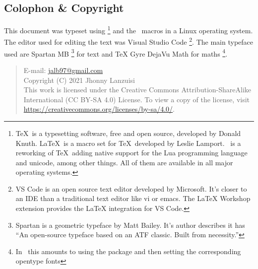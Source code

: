 \newpage
\begin{small}
    \begin{center}
    \begin{minipage}{0.4\paperwidth}
        \section*{Colophon \& Copyright}
        This document was typeset using \LuaTeX%
        \footnote{%
            \TeX\ is
            a typesetting software, free and open source,
            developed by Donald Knuth. \LaTeX\ is a macro
            set for \TeX\ developed by Leslie Lamport. \LuaTeX\ is
            a reworking of \TeX\ adding native support for the Lua
            programming language and unicode, among other things.
            All of them are available in all major
            operating systems.
        }
        and the \LaTeXe\ macros in a Linux operating system.
        The editor used for editing the text was Visual Studio Code%
        \footnote{%
            VS Code is an open source text editor
            developed by Microsoft.
            It's closer to an IDE than a traditional text editor
            like vi or emacs.
            The LaTeX Workshop extension provides the LaTeX
            integration for VS Code.
        }.
        The main typeface used are Spartan MB%
        \footnote{%
            Spartan is a geometric typeface
            by Matt Bailey. It's author describes it has
            ``An open-source typeface based on an ATF classic. 
            Built from necessity.''
        }
        for text and TeX Gyre DejaVu Math for maths%
        \footnote{%
            In \LuaLaTeX\ this amounts to using the package
            and then setting the corresponding
            opentype fonts
        }.

        \medskip
        \begin{quote}\ttfamily\raggedright\footnotesize%
            E-mail: \url{jalb97@gmail.com} \\
            Copyright (C) 2021 Jhonny Lanzuisi \\
            This work is licensed under the Creative Commons Attribution-ShareAlike
            International (CC BY-SA 4.0)  License. To view a copy of the license,
            visit \url{https://creativecommons.org/licenses/by-sa/4.0/}.
        \end{quote}
    \end{minipage}
    \end{center}
\end{small}
\newpage
\tableofcontents
